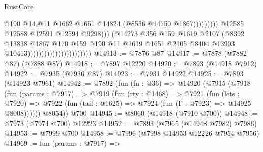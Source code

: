 \begin{lexlean}{RustCore}
\begin{coremodule}
                                                                    @190
                                                                    @14
                                                                    @11
                                                                    @1662
                                                                    @1651
                                                                    @14824
                                                                    (@8556 @14750 @1867)))))))))
                                                    @12585
                                                    @12588
                                                    @12591
                                                    @12594
                                                    @9298)))
                                              (@14273
                                                @356
                                                @159
                                                @1619
                                                @2107
                                                (@8392
                                                  @13838
                                                  @1867
                                                  @170
                                                  @159
                                                  @190
                                                  @11
                                                  @1619
                                                  @1651
                                                  @2105
                                                  @8404
                                                  @13903
                                                  @10413)))))))))))))))))))))))
@14913 := @7876 @87
@14917 := @7878 (@7882 @87) (@7888 @87)
@14918 := @7897 @12220
@14920 := @7893 (@14918 @7912)
@14922 := @7935 (@7936 @87)
@14923 := @7931 @14922
@14925 := @7893 (@14923 @7961)
@14942 := @7892
    (fun (fn : @36) =>
    @14920
      (@7915
        (@7918
          (fun (params : @7917) =>
          @7919
            (fun (rty : @1468) =>
            @7921
              (fun (lets : @7920) =>
              @7922 (fun (tail : @1625) => @7924 (fun (Γ : @7923) => @14925 @8008))))))
        @8054))
    @700
@14945 := @8060 (@14918 (@7910 @700))
@14948 := @7973 (@7974 @700) @12223
@14952 := @7893 (@7965 (@14948 @7982) @7986)
@14953 := @7999 @700
@14958 := @7996 (@7998 @14953 @12226 @7954 @7956)
@14969 := fun (params : @7917) =>

\end{coremodule}
\end{lexlean}
